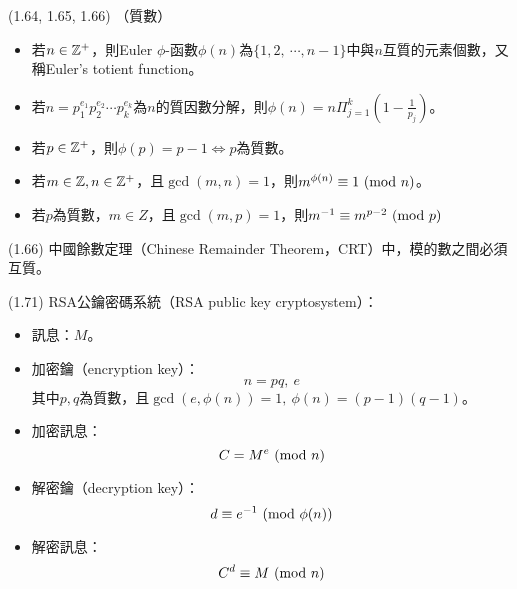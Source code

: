 \item \begin{theorem}{(1.64, 1.65, 1.66)} （質數）
    \begin{itemize}
        \item 若$n \in \mathbb{Z}^+$，則Euler $\phi$-函數$\phi(n)$為$\{1, 2, \ \cdots, n - 1\}$中與$n$互質的元素個數，又稱Euler's totient function。
        \item 若$n = p_1^{e_1}p_2^{e_2}\cdots p_k^{e_k}$為$n$的質因數分解，則$\phi(n) = n\Pi_{j = 1}^{k}(1 - \frac{1}{p_j})$。
        \item 若$p \in \mathbb{Z}^+$，則$\phi(p) = p - 1$$\iff$$p$為質數。
        \item 若$m \in \mathbb{Z}, n \in \mathbb{Z}^+$，且$\gcd(m, n) = 1$，則$m^{\phi(n)} \equiv 1 \ (\mathrm{mod}\ n)$。
        \item 若$p$為質數，$m \in Z$，且$\gcd(m, p) = 1$，則$m^{-1} \equiv m^{p - 2} \ (\mathrm{mod}\ p)$
    \end{itemize}
\end{theorem}

\item \begin{theorem}{(1.66)} 中國餘數定理（Chinese Remainder Theorem，CRT）中，模的數之間必須互質。
\end{theorem}

\item \begin{theorem}{(1.71)} RSA公鑰密碼系統（RSA public key cryptosystem）：\begin{itemize}
        \item 訊息：$M$。
        \item 加密鑰（encryption key）：\begin{equation}
            n = pq, \ e
        \end{equation}
        其中$p, q$為質數，且$\gcd(e, \phi(n)) = 1, \ \phi(n) = (p - 1)(q - 1)$。
        \item 加密訊息：\begin{equation}
            C = M^e \ (\mathrm{mod}\ n)
        \end{equation}
        \item 解密鑰（decryption key）：\begin{equation}
            d \equiv e^{-1} \ (\mathrm{mod}\ \phi(n))
        \end{equation}
        \item 解密訊息：\begin{equation}
            C^d \equiv M \ (\mathrm{mod}\ n)
        \end{equation}
    \end{itemize}
\end{theorem}
